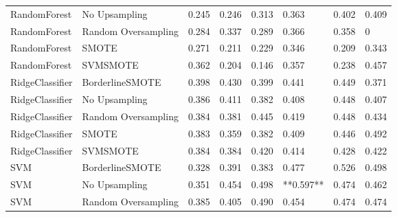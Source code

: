\begin{tabular}{llllllll}
                RandomForest &       No Upsampling & 0.245 &                     0.246 &                 0.313 &                  0.363 &                                   0.402 &    0.409 \\
                RandomForest & Random Oversampling & 0.284 &                     0.337 &                 0.289 &                  0.366 &                                   0.358 &        0 \\
                RandomForest &               SMOTE & 0.271 &                     0.211 &                 0.229 &                  0.346 &                                   0.209 &    0.343 \\
                RandomForest &            SVMSMOTE & 0.362 &                     0.204 &                 0.146 &                  0.357 &                                   0.238 &    0.457 \\
             RidgeClassifier &     BorderlineSMOTE & 0.398 &                     0.430 &                 0.399 &                  0.441 &                                   0.449 &    0.371 \\
             RidgeClassifier &       No Upsampling & 0.386 &                     0.411 &                 0.382 &                  0.408 &                                   0.448 &    0.407 \\
             RidgeClassifier & Random Oversampling & 0.384 &                     0.381 &                 0.445 &                  0.419 &                                   0.448 &    0.434 \\
             RidgeClassifier &               SMOTE & 0.383 &                     0.359 &                 0.382 &                  0.409 &                                   0.446 &    0.492 \\
             RidgeClassifier &            SVMSMOTE & 0.384 &                     0.384 &                 0.420 &                  0.414 &                                   0.428 &    0.422 \\
                         SVM &     BorderlineSMOTE & 0.328 &                     0.391 &                 0.383 &                  0.477 &                                   0.526 &    0.498 \\
                         SVM &       No Upsampling & 0.351 &                     0.454 &                 0.498 &              **0.597** &                                   0.474 &    0.462 \\
                         SVM & Random Oversampling & 0.385 &                     0.405 &                 0.490 &                  0.454 &                                   0.474 &    0.474 \\

\end{tabular}
